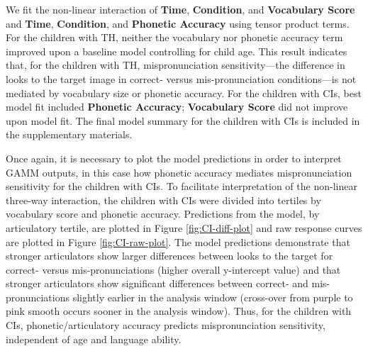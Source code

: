 \documentclass[
]{article}
\begin{document}
We fit the non-linear interaction of \textbf{Time}, \textbf{Condition}, and \textbf{Vocabulary Score} and \textbf{Time}, \textbf{Condition}, and \textbf{Phonetic Accuracy} using tensor product terms. For the children with TH, neither the vocabulary nor phonetic accuracy term improved upon a baseline model controlling for child age. This result indicates that, for the children with TH, mispronunciation sensitivity---the difference in looks to the target image in correct- versus mis-pronunciation conditions---is not mediated by vocabulary size or phonetic accuracy. For the children with CIs, best model fit included \textbf{Phonetic Accuracy}; \textbf{Vocabulary Score} did not improve upon model fit. The final model summary for the children with CIs is included in the supplementary materials.

Once again, it is necessary to plot the model predictions in order to interpret GAMM outputs, in this case how phonetic accuracy mediates mispronunciation sensitivity for the children with CIs. To facilitate interpretation of the non-linear three-way interaction, the children with CIs were divided into tertiles by vocabulary score and phonetic accuracy. Predictions from the model, by articulatory tertile, are plotted in Figure \ref{fig:CI-diff-plot} and raw response curves are plotted in Figure \ref{fig:CI-raw-plot}. The model predictions demonstrate that stronger articulators show larger differences between looks to the target for correct- versus mis-pronunciations (higher overall y-intercept value) and that stronger articulators show significant differences between correct- and mis-pronunciations slightly earlier in the analysis window (cross-over from purple to pink smooth occurs sooner in the analysis window). Thus, for the children with CIs, phonetic/articulatory accuracy predicts mispronunciation sensitivity, independent of age and language ability.
\end{document}
